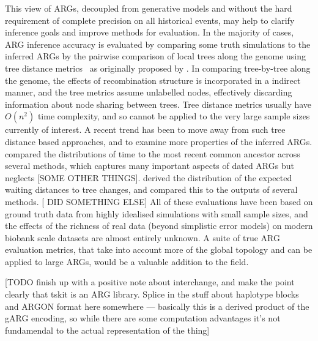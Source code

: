 \documentclass{article}
\begin{document}
This view of ARGs,
decoupled from generative models and
without the hard requirement
of complete precision on all historical events, may help
to clarify inference goals and improve
methods for evaluation.
In the majority of cases,
ARG inference accuracy is evaluated by comparing some truth simulations
to the inferred ARGs by the pairwise comparison of local trees along the genome
using tree distance
metrics~\citep[e.g.][]{robinson1981comparison,kendall2016mapping}
as originally proposed by \citet{kuhner2015assessing}.
In comparing tree-by-tree along the genome, the effects of recombination
structure is incorporated in a indirect manner, and the tree
metrics assume unlabelled nodes, effectively discarding information
about node sharing between trees.
Tree distance metrics usually have $O(n^2)$ time complexity, and so cannot be
applied to the very large sample sizes currently of interest.
A recent trend has been to move away from such tree distance
based approaches, and to examine more properties of the inferred ARGs.
\citet{brandt2021evaluation} compared the
distributions of time to the most recent common ancestor across several
methods, which captures many important aspects of dated ARGs
but neglects [SOME OTHER THINGS].
\citet{deng2021distribution} derived the distribution of the expected
waiting distances to tree changes, and compared this to the
outputs of several methods.
[ \citet{ignatieva2023distribution} DID SOMETHING ELSE]
All of these evaluations have been based on
ground truth data from highly idealised simulations
with small sample sizes,
and the effects of the richness of real data
(beyond simplistic error models)
on modern biobank scale datasets
are almost entirely unknown.
A suite of true ARG evaluation metrics, that take into account more of the
global topology and can be applied to large ARGs, would be a
valuable addition to the field.

[TODO finish up with a positive note about interchange, and make the point
clearly that tskit is an ARG library. Splice in the stuff about haplotype
blocks and ARGON format here somewhere --- basically this is a derived product
of the gARG encoding, so while there are some computation advantages it's not
fundamendal to the actual representation of the thing]

\end{document}
